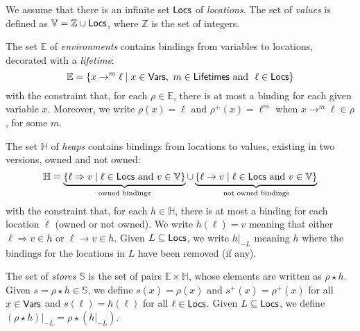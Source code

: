 \begin{definition}
  We assume that there is an infinite set $\mathsf{Locs}$ of \emph{locations}.
  The set of \emph{values} is defined as $\mathbb{V}=\mathbb{Z}\cup\mathsf{Locs}$,
  where $\mathbb{Z}$ is the set of integers.

  The set $\mathbb{E}$
  of \emph{environments} contains bindings from variables to locations,
  decorated with a \emph{lifetime}:
  \[
  \mathbb{E}=\{x\to^m\ell\mid x\in\mathsf{Vars},\ m\in\mathsf{Lifetimes}\text{ and }\ \ell\in\mathsf{Locs}\}
  \]
  with the constraint that, for each $\rho\in\mathbb{E}$, there is at most a binding for each
  given variable $x$. %
  Moreover, we write $\rho(x)=\ell$ and
  $\rho^+(x)=\ell^m$ when
  $x\rightarrow^m\ell\in\rho$, for some $m$.

  The set $\mathbb{H}$ of \emph{heaps} contains bindings from locations to values,
  existing in two versions, owned and not owned:
  \[
  \mathbb{H}=
  \underbrace{\{\ell\Rightarrow v\mid\ell\in\mathsf{Locs}\text{ and }v\in\mathbb{V}\}}_{\text{owned bindings}}
  \cup
  \underbrace{\{\ell\rightarrow v\mid\ell\in\mathsf{Locs}\text{ and }v\in\mathbb{V}\}}_{\text{not owned bindings}}
  \]
  with the constraint that, for each $h\in\mathbb{H}$, there is at most a binding for each
  location $\ell$ (owned or not owned). We write $h(\ell)=v$ meaning that
  either $\ell\Rightarrow v\in h$ or $\ell\rightarrow v\in h$. Given $L\subseteq\mathsf{Locs}$,
  we write $h|_{-L}$ meaning $h$ where the bindings for the locations in $L$
  have been removed (if any).

  The set of \emph{stores} $\mathbb{S}$ is the set of pairs
  $\mathbb{E}\times\mathbb{H}$, whose elements are written as $\rho\star h$.
  Given $s=\rho\star h\in\mathbb{S}$, we define $s(x)=\rho(x)$
  and $s^+(x)=\rho^+(x)$ for all
  $x\in\mathsf{Vars}$ and $s(\ell)=h(\ell)$ for all $\ell\in\mathsf{Locs}$.
  Given $L\subseteq\mathsf{Locs}$, we define $(\rho\star h)|_{-L}=\rho\star(h|_{-L})$.
\end{definition}

